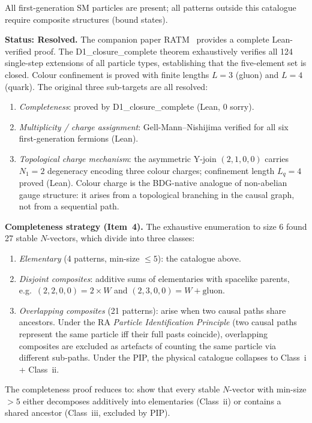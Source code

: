 \documentclass[11pt,a4paper]{article}
\begin{document}
All first-generation SM particles are present; all patterns outside this
catalogue require composite structures (bound states).

\textbf{Status: Resolved.}
The companion paper RATM~\citep{Sandeman2026RATM} provides a complete
Lean-verified proof. The D1\_closure\_complete theorem exhaustively
verifies all 124 single-step extensions of all particle types,
establishing that the five-element set is closed. Colour confinement
is proved with finite lengths $L=3$ (gluon) and $L=4$ (quark).
The original three sub-targets are all resolved:
\begin{enumerate}[noitemsep]
\item \emph{Completeness}: proved by D1\_closure\_complete (Lean, 0 sorry).
\item \emph{Multiplicity / charge assignment}: Gell-Mann--Nishijima
  verified for all six first-generation fermions (Lean).
\item \emph{Topological charge mechanism}: the asymmetric Y-join
  $(2,1,0,0)$ carries $N_1=2$ degeneracy encoding three colour charges;
  confinement length $L_q=4$ proved (Lean). Colour charge is the
  BDG-native analogue of non-abelian gauge structure: it
  arises from a topological branching in the causal graph, not from a
  sequential path.
\end{enumerate}

\textbf{Completeness strategy (Item~4).}
The exhaustive enumeration to size 6 found 27 stable $N$-vectors, which divide
into three classes:
\begin{enumerate}[noitemsep,label=\roman*.]
  \item \emph{Elementary} (4 patterns, min-size $\leq 5$): the catalogue above.
  \item \emph{Disjoint composites}: additive sums of elementaries with spacelike
  parents, e.g.\ $(2,2,0,0) = 2\times W$ and $(2,3,0,0) = W + \mathrm{gluon}$.
  \item \emph{Overlapping composites} (21 patterns): arise when two causal paths
  share ancestors. Under the RA \emph{Particle Identification Principle}
  (two causal paths represent the same particle iff their full pasts coincide),
  overlapping composites are excluded as artefacts of counting the same
  particle via different sub-paths. Under the PIP, the physical catalogue
  collapses to Class~i + Class~ii.
\end{enumerate}
The completeness proof reduces to: show that every stable $N$-vector with
min-size $> 5$ either decomposes additively into elementaries (Class~ii) or
contains a shared ancestor (Class~iii, excluded by PIP).
\end{document}
